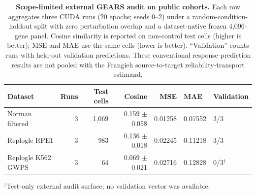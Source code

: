 \begin{table}[H]
\centering
\small
\setlength{\tabcolsep}{4pt}
\caption{\textbf{Scope-limited external GEARS audit on public cohorts.}
Each row aggregates three CUDA runs (20 epochs; seeds 0--2) under a
random-condition-holdout split with zero perturbation overlap and a
dataset-native frozen 4,096-gene panel. Cosine similarity is reported on
non-control test cells (higher is better); MSE and MAE use the same cells
(lower is better). ``Validation'' counts runs with held-out validation
predictions. These conventional response-prediction results are not pooled
with the Frangieh source-to-target reliability-transport estimand.}
\label{tab:external-gears}
\begin{tabular}{@{}lrrrrll@{}}
\toprule
Dataset & Runs & Test cells & Cosine & MSE & MAE & Validation \\
\midrule
Norman filtered & 3 & 1,069 & 0.159 $\pm$ 0.058 & 0.01258 & 0.07552 & 3/3 \\
Replogle RPE1 & 3 & 983 & 0.136 $\pm$ 0.018 & 0.02245 & 0.11218 & 3/3 \\
Replogle K562 GWPS & 3 & 64 & 0.069 $\pm$ 0.021 & 0.02716 & 0.12828 & 0/3$^{\dagger}$ \\
\bottomrule
\end{tabular}
\par\noindent
\raggedright\footnotesize $^{\dagger}$Test-only external audit surface; no validation vector was available.
\end{table}
